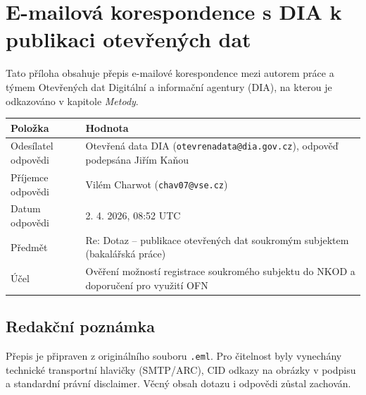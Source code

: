 \chapter{E-mailová korespondence s DIA k publikaci otevřených dat}
\label{app:korespondence-dia}

Tato příloha obsahuje přepis e-mailové korespondence mezi autorem práce a týmem Otevřených dat Digitální a informační agentury (DIA), na kterou je odkazováno v kapitole \textit{Metody}.

{
\footnotesize
\setlength{\tabcolsep}{4pt}
\renewcommand{\arraystretch}{1.15}
\begin{tabularx}{\textwidth}{@{}L{3.3cm}X@{}}
\toprule
\textbf{Položka} & \textbf{Hodnota} \\
\midrule
Odesílatel odpovědi & Otevřená data DIA (\texttt{otevrenadata@dia.gov.cz}), odpověď podepsána Jiřím Kaňou \\
Příjemce odpovědi & Vilém Charwot (\texttt{chav07@vse.cz}) \\
Datum odpovědi & 2. 4. 2026, 08:52 UTC \\
Předmět & Re: Dotaz -- publikace otevřených dat soukromým subjektem (bakalářská práce) \\
Účel & Ověření možností registrace soukromého subjektu do NKOD a doporučení pro využití OFN \\
\bottomrule
\end{tabularx}
}

\section*{Redakční poznámka}
Přepis je připraven z originálního souboru \texttt{.eml}. Pro čitelnost byly vynechány technické transportní hlavičky (SMTP/ARC), CID odkazy na obrázky v podpisu a standardní právní disclaimer. Věcný obsah dotazu i odpovědi zůstal zachován.

